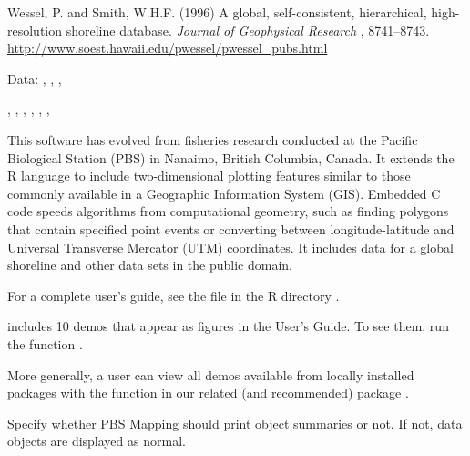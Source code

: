 \documentclass[letterpaper]{book}
\begin{document}
%
\begin{References}\relax
Wessel, P. and Smith, W.H.F. (1996) A global, self-consistent,
hierarchical, high-resolution shoreline database. \emph{Journal of
Geophysical Research} , 8741--8743. \\{}
\url{http://www.soest.hawaii.edu/pwessel/pwessel_pubs.html}
\end{References}
%
\begin{SeeAlso}\relax
Data:  , , , 

, , ,
, , ,
\end{SeeAlso}
%
\begin{Description}\relax
This software has evolved from fisheries research
conducted at the Pacific Biological Station (PBS) in Nanaimo,
British Columbia, Canada. It extends the R language to include
two-dimensional plotting features similar to those commonly
available in a Geographic Information System (GIS).  Embedded
C code speeds algorithms from computational geometry, such as
finding polygons that contain specified point events or
converting between longitude-latitude and Universal Transverse
Mercator (UTM) coordinates.  It includes data for a global
shoreline and other data sets in the public domain.

For a complete user's guide, see the file  
in the R directory .

 includes 10 demos that appear as figures in 
the User's Guide. To see them, run the function .

More generally, a user can view all demos available from locally 
installed packages with the function  in our 
related (and recommended) package .
\end{Description}
%
\begin{Description}\relax
Specify whether PBS Mapping should print object summaries or not. If
not, data objects are displayed as normal.
\end{Description}
\end{document}
